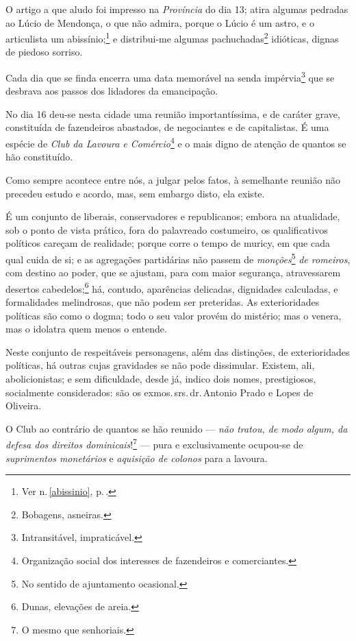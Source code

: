 O artigo a que aludo foi impresso na \emph{Província} do dia 13; atira
algumas pedradas ao Lúcio de Mendonça, o que não admira, porque o Lúcio
é um astro, e o articulista um abissínio;\footnote{Ver n.\,\ref{abissinio}, p.\,\pageref{abissinio}.} e distribui-me algumas pachuchadas\footnote{
  Bobagens, asneiras.} idióticas, dignas de piedoso sorriso.

Cada dia que se finda encerra uma data memorável na senda
impérvia\footnote{Intransitável, impraticável.} que se desbrava aos
passos dos lidadores da emancipação.

No dia 16 deu-se nesta cidade uma reunião importantíssima, e de caráter
grave, constituída de fazendeiros abastados, de negociantes e de
capitalistas. É uma espécie de \emph{Club da Lavoura e
Comércio}\footnote{Organização social dos interesses de fazendeiros e
  comerciantes.} e o mais digno de atenção de quantos se hão
constituído.

Como sempre acontece entre nós, a julgar pelos fatos, à semelhante
reunião não precedeu estudo e acordo, mas, sem embargo disto, ela
existe.

É um conjunto de liberais, conservadores e republicanos; embora na
atualidade, sob o ponto de vista prático, fora do palavreado costumeiro,
os qualificativos políticos careçam de realidade; porque corre o tempo
de muricy, em que cada qual cuida de si; e as agregações partidárias não
passem de \emph{monções}\footnote{No sentido de ajuntamento ocasional.}
\emph{de romeiros}, com destino ao poder, que se ajustam, para com maior
segurança, atravessarem desertos cabedelos;\footnote{Dunas, elevações
  de areia.} há, contudo, aparências delicadas, dignidades calculadas,
e formalidades melindrosas, que não podem ser preteridas. As
exterioridades políticas são como o dogma; todo o seu valor provém do
mistério; mas o venera, mas o idolatra quem menos o entende.

Neste conjunto de respeitáveis personagens, além das distinções, de
exterioridades políticas, há outras cujas gravidades se não pode
dissimular. Existem, ali, abolicionistas; e sem dificuldade, desde já,
indico dois nomes, prestigiosos, socialmente considerados: são os exmos.\,srs.\,dr.\,Antonio Prado e Lopes de Oliveira.

O Club ao contrário de quantos se hão reunido --- \emph{não tratou, de
modo algum, da defesa dos direitos dominicais}!\footnote{O mesmo que
  senhoriais.} --- pura e exclusivamente ocupou-se de \emph{suprimentos
monetários} e \emph{aquisição de colonos} para a lavoura.

